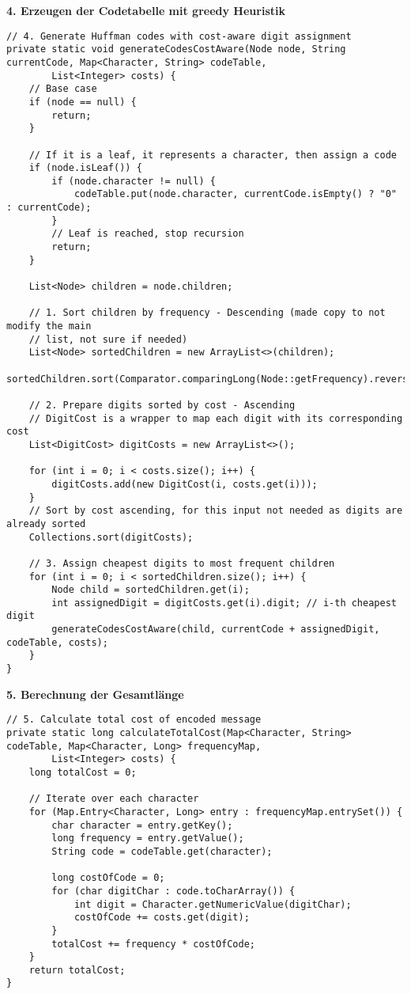 \documentclass[a4paper,10pt,ngerman]{scrartcl}
\begin{document}
\textbf{4. Erzeugen der Codetabelle mit greedy Heuristik}
\begin{lstlisting}
// 4. Generate Huffman codes with cost-aware digit assignment
private static void generateCodesCostAware(Node node, String currentCode, Map<Character, String> codeTable,
        List<Integer> costs) {
    // Base case
    if (node == null) {
        return;
    }

    // If it is a leaf, it represents a character, then assign a code
    if (node.isLeaf()) {
        if (node.character != null) {
            codeTable.put(node.character, currentCode.isEmpty() ? "0" : currentCode);
        }
        // Leaf is reached, stop recursion
        return;
    }

    List<Node> children = node.children;

    // 1. Sort children by frequency - Descending (made copy to not modify the main
    // list, not sure if needed)
    List<Node> sortedChildren = new ArrayList<>(children);
    sortedChildren.sort(Comparator.comparingLong(Node::getFrequency).reversed());

    // 2. Prepare digits sorted by cost - Ascending
    // DigitCost is a wrapper to map each digit with its corresponding cost
    List<DigitCost> digitCosts = new ArrayList<>();

    for (int i = 0; i < costs.size(); i++) {
        digitCosts.add(new DigitCost(i, costs.get(i)));
    } 
    // Sort by cost ascending, for this input not needed as digits are already sorted
    Collections.sort(digitCosts);

    // 3. Assign cheapest digits to most frequent children
    for (int i = 0; i < sortedChildren.size(); i++) {
        Node child = sortedChildren.get(i);
        int assignedDigit = digitCosts.get(i).digit; // i-th cheapest digit
        generateCodesCostAware(child, currentCode + assignedDigit, codeTable, costs);
    }
}
\end{lstlisting}
\textbf{5. Berechnung der Gesamtlänge}

\begin{lstlisting}
// 5. Calculate total cost of encoded message
private static long calculateTotalCost(Map<Character, String> codeTable, Map<Character, Long> frequencyMap,
        List<Integer> costs) {
    long totalCost = 0;

    // Iterate over each character
    for (Map.Entry<Character, Long> entry : frequencyMap.entrySet()) {
        char character = entry.getKey();
        long frequency = entry.getValue();
        String code = codeTable.get(character);

        long costOfCode = 0;
        for (char digitChar : code.toCharArray()) {
            int digit = Character.getNumericValue(digitChar);
            costOfCode += costs.get(digit);
        }
        totalCost += frequency * costOfCode;
    }
    return totalCost;
}
\end{lstlisting}
\end{document}
